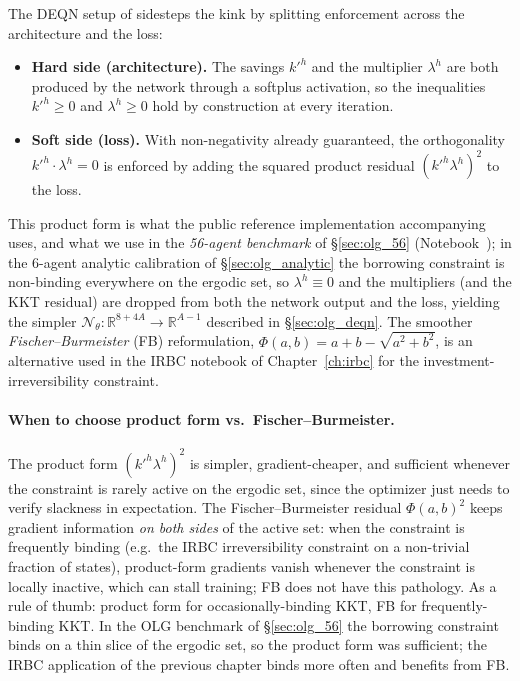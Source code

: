 \documentclass[11pt,a4paper]{report}
\begin{document}
The DEQN setup of \citet{azinovicDEEPEQUILIBRIUMNETS2022} sidesteps the kink by splitting enforcement across the architecture and the loss:
\begin{itemize}[itemsep=2pt]
\item \textbf{Hard side (architecture).}  The savings $k'^h$ and the multiplier $\lambda^h$ are both produced by the network through a softplus activation, so the inequalities $k'^h \geq 0$ and $\lambda^h \geq 0$ hold by construction at every iteration.
\item \textbf{Soft side (loss).}  With non-negativity already guaranteed, the orthogonality $k'^h \cdot \lambda^h = 0$ is enforced by adding the squared product residual $(k'^h \lambda^h)^2$ to the loss.
\end{itemize}
This product form is what the public reference implementation accompanying \citet{azinovicDEEPEQUILIBRIUMNETS2022} uses, and what we use in the \emph{56-agent benchmark} of \S\ref{sec:olg_56} (Notebook~); in the 6-agent analytic calibration of \S\ref{sec:olg_analytic} the borrowing constraint is non-binding everywhere on the ergodic set, so $\lambda^h \equiv 0$ and the multipliers (and the KKT residual) are dropped from both the network output and the loss, yielding the simpler $\mathcal{N}_\theta: \mathbb{R}^{8+4A} \to \mathbb{R}^{A-1}$ described in \S\ref{sec:olg_deqn}.  The smoother \emph{Fischer--Burmeister} (FB) reformulation, $\Phi(a,b) = a + b - \sqrt{a^2 + b^2}$, is an alternative used in the IRBC notebook of Chapter~\ref{ch:irbc} for the investment-irreversibility constraint.

\paragraph{When to choose product form vs.\ Fischer--Burmeister.}  The product form $(k'^h \lambda^h)^2$ is simpler, gradient-cheaper, and sufficient whenever the constraint is rarely active on the ergodic set, since the optimizer just needs to verify slackness in expectation.  The Fischer--Burmeister residual $\Phi(a,b)^2$ keeps gradient information \emph{on both sides} of the active set: when the constraint is frequently binding (e.g.\ the IRBC irreversibility constraint on a non-trivial fraction of states), product-form gradients vanish whenever the constraint is locally inactive, which can stall training; FB does not have this pathology.  As a rule of thumb: product form for occasionally-binding KKT, FB for frequently-binding KKT.  In the OLG benchmark of \S\ref{sec:olg_56} the borrowing constraint binds on a thin slice of the ergodic set, so the product form was sufficient; the IRBC application of the previous chapter binds more often and benefits from FB.
\end{document}
